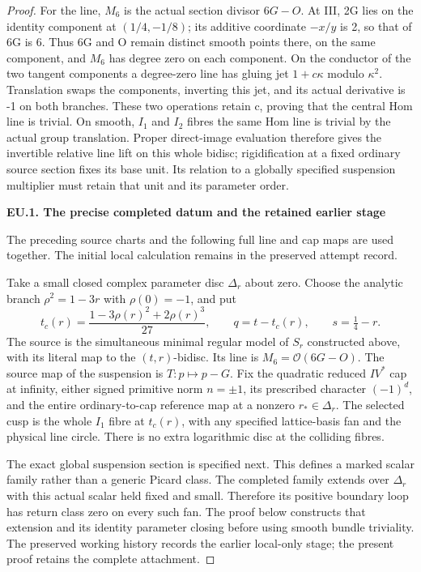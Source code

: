 \begin{proof}
For the line, \(M_6\) is the actual section divisor \(6G-O\). At III, 2G
lies on the identity component at \((1/4,-1/8)\); its additive coordinate
\(-x/y\) is 2, so that of 6G is 6. Thus 6G and O remain
distinct smooth points there, on the same component, and \(M_6\) has
degree zero on each component. On the conductor of the two tangent
components a degree-zero line has gluing jet \(1+c\kappa\) modulo
\(\kappa^2\). Translation swaps the components, inverting this jet, and its actual derivative is -1 on both branches. These two
operations retain c, proving that the central Hom line is trivial.
On smooth, \(I_1\) and \(I_2\) fibres the same Hom line is trivial by the
actual group translation. Proper direct-image evaluation therefore
gives the invertible relative line lift on this whole bidisc;
rigidification at a fixed ordinary source section fixes its base
unit. Its relation to a globally specified suspension multiplier
must retain that unit and its parameter order.

\par

\medskip\noindent\textbf{EU.1. The precise completed datum and the retained earlier stage}

\par\nobreak

The preceding source charts and the following full line and cap maps are used together. The initial local calculation remains in the preserved attempt record.

Take a small closed complex parameter disc \(\Delta_r\) about zero.
Choose the analytic branch \(\rho^2=1-3r\) with \(\rho(0)=-1\), and put
\[
 t_c(r)=\frac{1-3\rho(r)^2+2\rho(r)^3}{27},\qquad
 q=t-t_c(r),\qquad s=\tfrac14-r.
 \tag{EU.1}
\]
The source is the simultaneous minimal regular model of \(S_r\)
constructed above, with its literal map to the \((t,r)\)-bidisc. Its
line is \(M_6=\mathcal O(6G-O)\). The source map of the suspension is
\(T:p\mapsto p-G\). Fix the quadratic reduced \(IV^*\) cap at infinity,
either signed primitive norm \(n=\pm1\), its prescribed character
\((-1)^d\), and the entire ordinary-to-cap reference map at a nonzero
\(r_*\in\Delta_r\). The selected cusp is the whole \(I_1\) fibre at
\(t_c(r)\), with any specified lattice-basis fan and the physical line
circle. There is no extra logarithmic disc at the colliding fibres.

The exact global suspension section is specified next. This defines a
marked scalar family rather than a generic Picard class. The completed
family extends over \(\Delta_r\) with this actual scalar held fixed and
small. Therefore its positive boundary loop has return class zero on
every such fan. The proof below constructs that extension and its
identity parameter closing before using smooth bundle triviality.
The preserved working history records the earlier local-only stage; the present proof retains the complete attachment.


\end{proof}
